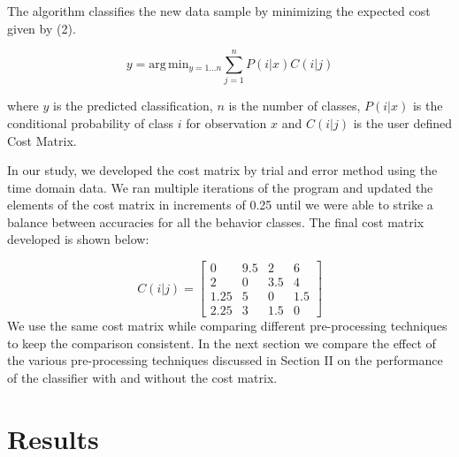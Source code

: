 \documentclass[conference]{IEEEtran}
\begin{document}
The algorithm classifies the new data sample by minimizing the expected cost given by (2).

\begin{equation}
	y = \mathrm{arg} \, \mathrm{min}_{y = 1 \ldots n} \sum^n_{j=1} P(i|x) C(i|j)
\end{equation}

where $y$ is the predicted classification, $n$ is the number of classes, $P(i|x)$ is the conditional probability of class $i$ for observation $x$ and $C(i|j)$ is the user defined Cost Matrix.

In our study, we developed the cost matrix by trial and error method using the time domain data. We ran multiple iterations of the program and updated the elements of the cost matrix in increments of 0.25 until we were able to strike a balance between accuracies for all the behavior classes. The final cost matrix developed is shown below:

$$
C(i|j) = \begin{bmatrix}
	0 & 9.5 & 2 & 6 \\
	2 & 0 & 3.5 & 4 \\
	1.25 & 5 & 0 & 1.5 \\
	2.25 & 3 & 1.5 & 0
\end{bmatrix}
$$
 We use the same cost matrix while comparing different pre-processing techniques to keep the comparison consistent. In the next section we compare the effect of the various pre-processing techniques discussed in Section II on the performance of the classifier with and without the cost matrix.
 
\section{Results}

\end{document}
